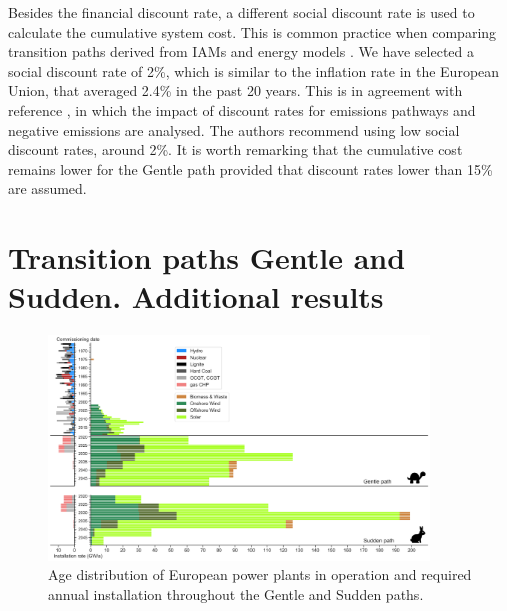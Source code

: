 \documentclass[3p]{elsarticle} %
\begin{document}
Besides the financial discount rate, a different social discount rate is used to calculate the cumulative system cost. This is common practice when comparing transition paths derived from IAMs and energy models \cite{in-depth_2018, Hermelink_2015}. We have selected a social discount rate of 2\%, which is similar to the inflation rate in the European Union, that averaged 2.4\% in the past 20 years. This is in agreement with reference \cite{Emmerling_2019}, in which the impact of discount rates for  emissions pathways and negative emissions are analysed. The authors recommend using low social discount rates, around 2\%. It is worth remarking that the cumulative cost remains lower for the Gentle path provided that discount rates lower than 15\% are assumed.

\clearpage

\section{Transition paths Gentle and Sudden. Additional results}

\begin{figure}[!h]
\centering
\includegraphics[width=0.9\textwidth]{figures/age_distribution_Base.png}
\caption{Age distribution of European power plants in operation \cite{powerplantmatching, IRENA_2019} and required annual installation throughout the Gentle and Sudden paths.} 
\end{figure}
\end{document}
